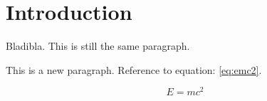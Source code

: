 \section{Introduction}
\label{sec:introduction}

Bladibla. 
This is still the same paragraph.

This is a new paragraph. Reference to equation: \ref{eq:emc2}.

\begin{equation} \label{eq:emc2}
    E = m c^2
\end{equation}

